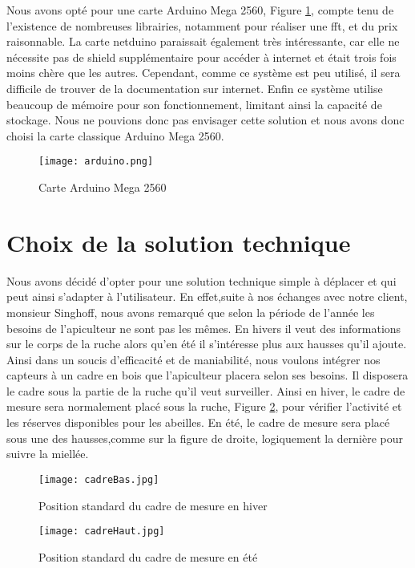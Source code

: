 Nous avons opté pour une carte Arduino Mega 2560, Figure \ref{fig:arduino}, compte tenu de l'existence de nombreuses librairies, notamment pour réaliser une fft, et du prix raisonnable. La carte netduino paraissait également très intéressante, car elle ne nécessite pas de shield supplémentaire pour accéder à internet et était trois fois moins chère que les autres. Cependant, comme ce système est peu utilisé, il sera difficile de trouver de la documentation sur internet. Enfin ce système utilise beaucoup de mémoire pour son fonctionnement, limitant ainsi la capacité de stockage. Nous ne pouvions donc pas envisager cette solution et nous avons donc choisi la carte classique Arduino Mega 2560.


\begin{figure}[h]
\centering\texttt{[image: arduino.png]}
\caption{\label{fig:arduino} Carte Arduino Mega 2560}
\end{figure} 

\section{Choix de la solution technique}
\vspace{1.5cm}

Nous avons décidé d'opter pour une solution technique simple à déplacer et qui peut ainsi s'adapter à l'utilisateur.
En effet,suite à nos échanges avec notre client, monsieur Singhoff, nous avons remarqué que selon la période de l'année les besoins de l'apiculteur ne sont pas les mêmes. En hivers il veut des informations sur le corps de la ruche alors qu'en été il s'intéresse plus aux hausses qu'il ajoute. Ainsi dans un soucis d'efficacité et de maniabilité, nous voulons intégrer nos capteurs à un cadre en bois que l'apiculteur placera selon ses besoins. Il disposera le cadre sous la partie de la ruche qu'il veut surveiller. Ainsi en hiver, le cadre de mesure sera normalement placé sous la ruche, Figure \ref{fig:rucheBas}, pour vérifier l'activité et les réserves disponibles pour les abeilles. En été, le cadre de mesure sera placé sous une des hausses,comme sur la figure de droite, logiquement la dernière pour suivre la miellée.
\begin{figure}[h]

\begin{minipage}[c]{.46\linewidth}
     \begin{center}
             \texttt{[image: cadreBas.jpg]}
             \caption{\label{fig:rucheBas} Position standard du cadre de mesure en hiver}
         \end{center}
   \end{minipage} \hfill
   \begin{minipage}[c]{.46\linewidth}
    \begin{center}
            \texttt{[image: cadreHaut.jpg]}
            \caption{\label{fig:rucheBas} Position standard du cadre de mesure en été}
        \end{center}
 \end{minipage}
 \end{figure}

